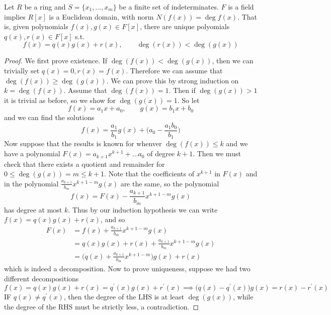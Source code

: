  \begin{theorem}
    Let $R$ be a ring and $S = \{x_1, \ldots, x_m\}$ be a finite set of indeterminates. $F$ is a field implies $R[x]$ is a Euclidean domain, with norm $N(f(x)) = \deg{f(x)}$. That is, given polynomials $f(x), g(x) \in F[x]$, there are unique polyomials $q(x), r(x) \in F[x]$ s.t. 
    \begin{equation}
      f(x) = q(x) g(x) + r(x), \qquad \deg(r(x)) < \deg(g(x))
    \end{equation} 
  \end{theorem}
  \begin{proof}
    We first prove existence. If $\deg(f(x)) < \deg(g(x))$, then we can trivially set $q(x) = 0, r(x) = f(x)$. Therefore we can assume that $\deg(f(x)) \geq \deg(g(x))$. We can prove this by strong induction on $k = \deg(f(x))$. Assume that $\deg(f(x)) = 1$. Then if $\deg(g(x)) > 1$ it is trivial as before, so we show for $\deg(g(x)) = 1$. So let 
    \begin{equation}
      f(x) = a_1 x + a_0, \qquad g(x) = b_1 x + b_0 
    \end{equation}
    and we can find the solutions 
    \begin{equation}
      f(x) = \frac{a_1}{b_1} g(x) + \bigg( a_0 - \frac{a_1 b_0}{b_1} \bigg)
    \end{equation} 
    Now suppose that the results is known for whenver $\deg(f(x)) \leq k$ and we have a polynomial $F(x) = a_{k+1} x^{k+1} + \ldots a_0$ of degree $k+1$. Then we must check that there exists a quotient and remainder for $0 \leq \deg(g(x)) = m \leq k + 1$. Note that the coefficients of $x^{k+1}$ in $F(x)$ and in the polynomial $\frac{a_{k+1}}{b_m} x^{k+1-m} g(x)$ are the same, so the polynomial 
    \begin{equation}
      f(x) = F(x) - \frac{a_{k+1}}{b_m} x^{k+1-m} g(x) 
    \end{equation}
    has degree at most $k$. Thus by our induction hypothesis we can write $f(x) = q(x) g(x) + r(x)$, and so 
    \begin{align}
      F(x) & = f(x) + \frac{a_{k+1}}{b_m} x^{k+1-m} g(x) \\
           & = q(x) g(x) + r(x) + \frac{a_{k+1}}{b_m} x^{k+1-m} g(x) \\ 
           & = \bigg( q(x) + \frac{a_{k+1}}{b_m} x^{k+1-m} \bigg) g(x) + r(x)
    \end{align} 
    which is indeed a decomposition. Now to prove uniqueness, suppose we had two different decompositions 
    \begin{equation}
      f(x) = q(x) g(x) + r(x) = q^\prime (x) g(x) + r^\prime (x) \implies \big( q(x) - q^\prime (x) \big) g(x) = r(x) - r^\prime (x)  
    \end{equation}  
    IF $q(x) \neq q^\prime (x)$, then the degree of the LHS is at least $\deg(g(x))$, while the degree of the RHS must be strictly less, a contradiction. 
  \end{proof}

